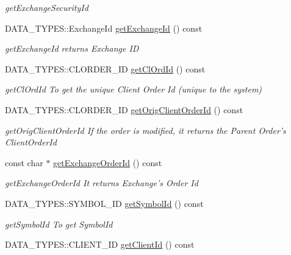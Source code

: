 \begin{DoxyCompactItemize}
\begin{DoxyCompactList}\small\item\em get\-Exchange\-Security\-Id \end{DoxyCompactList}\item 
D\-A\-T\-A\-\_\-\-T\-Y\-P\-E\-S\-::\-Exchange\-Id \hyperlink{class_a_p_i2_1_1_single_order_aa325a9347526339cbb4f9ff74ec8dc5e}{get\-Exchange\-Id} () const 
\begin{DoxyCompactList}\small\item\em get\-Exchange\-Id returns Exchange I\-D \end{DoxyCompactList}\item 
D\-A\-T\-A\-\_\-\-T\-Y\-P\-E\-S\-::\-C\-L\-O\-R\-D\-E\-R\-\_\-\-I\-D \hyperlink{class_a_p_i2_1_1_single_order_a9583a7b568a2003af1c78a006c8bebef}{get\-Cl\-Ord\-Id} () const 
\begin{DoxyCompactList}\small\item\em get\-Cl\-Ord\-Id To get the unique Client Order Id (unique to the system) \end{DoxyCompactList}\item 
D\-A\-T\-A\-\_\-\-T\-Y\-P\-E\-S\-::\-C\-L\-O\-R\-D\-E\-R\-\_\-\-I\-D \hyperlink{class_a_p_i2_1_1_single_order_a74887309b74ccdadaa8a2965bbd0d8d1}{get\-Orig\-Client\-Order\-Id} () const 
\begin{DoxyCompactList}\small\item\em get\-Orig\-Client\-Order\-Id If the order is modified, it returns the Parent Order's Client\-Order\-Id \end{DoxyCompactList}\item 
const char $\ast$ \hyperlink{class_a_p_i2_1_1_single_order_abeb2250a5b8f177be6b57326bbd29854}{get\-Exchange\-Order\-Id} () const 
\begin{DoxyCompactList}\small\item\em get\-Exchange\-Order\-Id It returns Exchange's Order Id \end{DoxyCompactList}\item 
D\-A\-T\-A\-\_\-\-T\-Y\-P\-E\-S\-::\-S\-Y\-M\-B\-O\-L\-\_\-\-I\-D \hyperlink{class_a_p_i2_1_1_single_order_a64a959d8130caf531784efd0a2e59926}{get\-Symbol\-Id} () const 
\begin{DoxyCompactList}\small\item\em get\-Symbol\-Id To get Symbol\-Id \end{DoxyCompactList}\item 
D\-A\-T\-A\-\_\-\-T\-Y\-P\-E\-S\-::\-C\-L\-I\-E\-N\-T\-\_\-\-I\-D \hyperlink{class_a_p_i2_1_1_single_order_aaa873364cebec88630b4ea9b512eaef8}{get\-Client\-Id} () const 

\end{DoxyCompactItemize}
